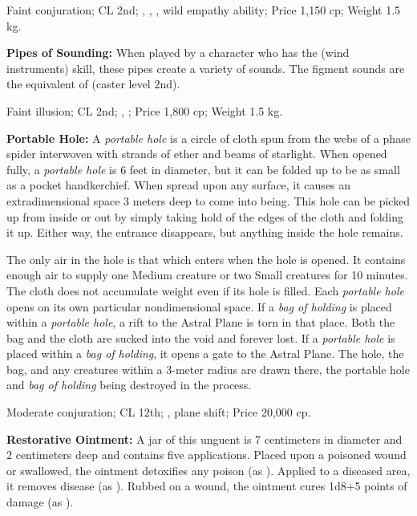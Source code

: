 Faint conjuration; CL 2nd; , , , wild empathy ability; Price 1,150 cp; Weight 1.5 kg.



\textbf{Pipes of Sounding:} When played by a character who has the  (wind instruments) skill, these pipes create a variety of sounds. The figment sounds are the equivalent of  (caster level 2nd).

Faint illusion; CL 2nd; , ; Price 1,800 cp; Weight 1.5 kg.



\textbf{Portable Hole:} A \emph{portable hole} is a circle of cloth spun from the webs of a phase spider interwoven with strands of ether and beams of starlight. When opened fully, a \emph{portable hole} is 6 feet in diameter, but it can be folded up to be as small as a pocket handkerchief. When spread upon any surface, it causes an extradimensional space 3 meters deep to come into being. This hole can be picked up from inside or out by simply taking hold of the edges of the cloth and folding it up. Either way, the entrance disappears, but anything inside the hole remains.

The only air in the hole is that which enters when the hole is opened. It contains enough air to supply one Medium creature or two Small creatures for 10 minutes. The cloth does not accumulate weight even if its hole is filled. Each \emph{portable hole} opens on its own particular nondimensional space. If a \emph{bag of holding} is placed within a \emph{portable hole}, a rift to the Astral Plane is torn in that place. Both the bag and the cloth are sucked into the void and forever lost. If a \emph{portable hole} is placed within a \emph{bag of holding}, it opens a gate to the Astral Plane. The hole, the bag, and any creatures within a 3-meter radius are drawn there, the portable hole and \emph{bag of holding} being destroyed in the process.

Moderate conjuration; CL 12th; , plane shift; Price 20,000 cp.



\textbf{Restorative Ointment:} A jar of this unguent is 7 centimeters in diameter and 2 centimeters deep and contains five applications. Placed upon a poisoned wound or swallowed, the ointment detoxifies any poison (as ). Applied to a diseased area, it removes disease (as ). Rubbed on a wound, the ointment cures 1d8+5 points of damage (as ).

